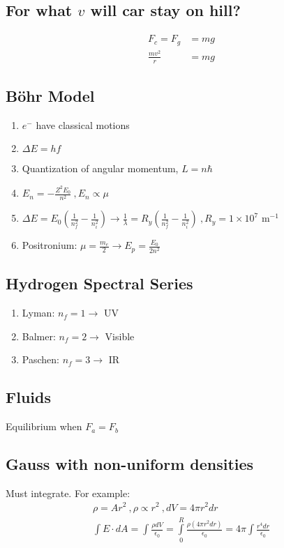 \documentclass[10pt,a4paper]{article}
\begin{document}
\subsection{For what $v$ will car stay on hill?}
\begin{align}
 F_c = F_g &= mg\\
 \frac{mv^2}{r} &= mg 
\end{align}

\subsection{B\"ohr Model}
\begin{enumerate}
    \item $e^-$ have classical motions
    \item $\Delta E = hf$
    \item Quantization of angular momentum, $L=n\hbar$
    \item $E_n = -\frac{Z^2E_0}{n^2}~,E_n \propto \mu$
    \item $\Delta E = E_0 \left( \frac{1}{n_f^2} - \frac{1}{n_i^2} \right) \rightarrow \frac{1}{\lambda} = R_y \left( \frac{1}{n_f^2} - \frac{1}{n_i^2}\right)~, R_y = 1\times 10^7$ m$^{-1}$
    \item Positronium: $\mu= \frac{m_e}{2} \rightarrow E_p = \frac{E_0}{2n^2}$
\end{enumerate}

\subsection{Hydrogen Spectral Series}
\begin{enumerate}
    \item Lyman: $n_f = 1 \rightarrow$ UV
    \item Balmer: $n_f = 2 \rightarrow$ Visible
    \item Paschen: $n_f = 3 \rightarrow$ IR
\end{enumerate}

\subsection{Fluids}
Equilibrium when $F_a = F_b$

\subsection{Gauss with non-uniform densities}
Must integrate. For example:
\begin{align}
 \rho = Ar^2~,\rho \propto r^2 ~, dV = 4\pi r^2 dr\\
 \int E \cdot dA = \int \frac{\rho dV}{\epsilon_0} = \int \limits_0^R \frac{\rho(4\pi r^2dr)}{\epsilon_0} = 4\pi \int \frac{r^4 dr}{\epsilon_0}
\end{align}
\end{document}
